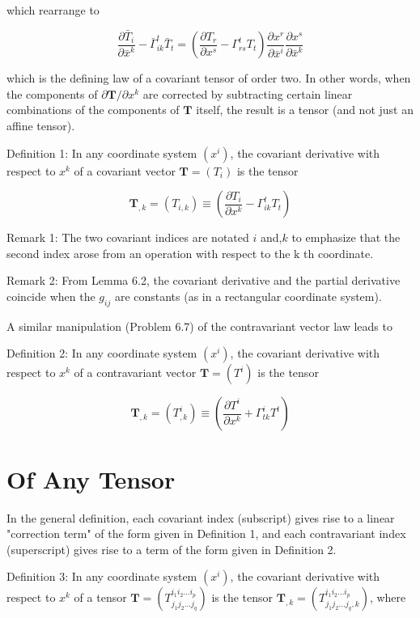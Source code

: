 \documentclass[10pt]{article}
\begin{document}
which rearrange to

$$
\frac{\partial \bar{T}_{i}}{\partial \bar{x}^{k}}-\bar{\Gamma}_{i k}^{t} \bar{T}_{t}=\left(\frac{\partial T_{r}}{\partial x^{s}}-\Gamma_{r s}^{t} T_{t}\right) \frac{\partial x^{r}}{\partial \bar{x}^{i}} \frac{\partial x^{s}}{\partial \bar{x}^{k}}
$$

which is the defining law of a covariant tensor of order two. In other words, when the components of $\partial \mathbf{T} / \partial x^{k}$ are corrected by subtracting certain linear combinations of the components of $\mathbf{T}$ itself, the result is a tensor (and not just an affine tensor).

Definition 1: In any coordinate system $\left(x^{i}\right)$, the covariant derivative with respect to $x^{k}$ of a covariant vector $\mathbf{T}=\left(T_{i}\right)$ is the tensor

$$
\mathbf{T}_{, k}=\left(T_{i, k}\right) \equiv\left(\frac{\partial T_{i}}{\partial x^{k}}-\Gamma_{i k}^{t} T_{t}\right)
$$

Remark 1: The two covariant indices are notated $i$ and,$k$ to emphasize that the second index arose from an operation with respect to the $\mathrm{k}$ th coordinate.

Remark 2: From Lemma 6.2, the covariant derivative and the partial derivative coincide when the $g_{i j}$ are constants (as in a rectangular coordinate system).

A similar manipulation (Problem 6.7) of the contravariant vector law leads to

Definition 2: In any coordinate system $\left(x^{i}\right)$, the covariant derivative with respect to $x^{k}$ of a contravariant vector $\mathbf{T}=\left(T^{i}\right)$ is the tensor

$$
\mathbf{T}_{, k}=\left(T_{, k}^{i}\right) \equiv\left(\frac{\partial T^{i}}{\partial x^{k}}+\Gamma_{t k}^{i} T^{t}\right)
$$

\section*{Of Any Tensor}
In the general definition, each covariant index (subscript) gives rise to a linear "correction term" of the form given in Definition 1, and each contravariant index (superscript) gives rise to a term of the form given in Definition 2.

Definition 3: In any coordinate system $\left(x^{i}\right)$, the covariant derivative with respect to $x^{k}$ of a tensor $\mathbf{T}=\left(T_{j_{1} j_{2} \ldots j_{q}}^{i_{1} i_{2} \ldots i_{p}}\right)$ is the tensor $\mathbf{T}_{, k}=\left(T_{j_{1} j_{2} \ldots j_{q}, k}^{i_{1} i_{2} \ldots i_{p}}\right)$, where
\end{document}
